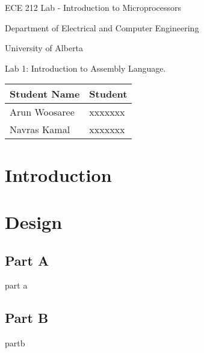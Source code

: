 \documentclass[letterpaper]{article}
\begin{document}
  \begin{titlepage}
    \begin{center}

      \LARGE
      ECE 212 Lab - Introduction to Microprocessors

Department of Electrical and Computer Engineering

University of Alberta
\vspace{2cm}

Lab 1: Introduction to Assembly Language.
\vspace{5cm}
\Large

      \begin{tabular}{ | m{5cm} | m{5cm} | }
        \hline
        Student Name & Student \\
        \hline
        Arun Woosaree & xxxxxxx \\
        \hline
        Navras Kamal & xxxxxxx \\
        \hline
      \end{tabular}




    \end{center}
\end{titlepage}


\tableofcontents
\newpage

\section{Introduction}
  \lipsum[1-2]
\section{Design}

  \subsection{Part A}
    part a
    \lipsum[3]
  \subsection{Part B}
    partb
    \lipsum[4]
\end{document}
